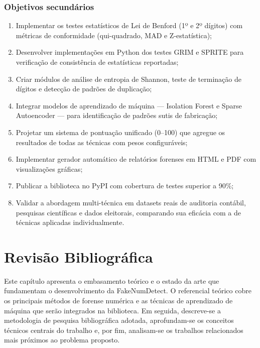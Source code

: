 \documentclass[
    12pt,                %
    openright,           %
    oneside,             %
    a4paper,             %
    english,             %
    brazil               %
]{abntex2}
\begin{document}
\subsection{Objetivos secundários}

\begin{enumerate}
    \item Implementar os testes estatísticos de Lei de Benford (1º e 2º dígitos) com métricas de conformidade (qui-quadrado, MAD e Z-estatística);
    \item Desenvolver implementações em Python dos testes GRIM e SPRITE para verificação de consistência de estatísticas reportadas;
    \item Criar módulos de análise de entropia de Shannon, teste de terminação de dígitos e detecção de padrões de duplicação;
    \item Integrar modelos de aprendizado de máquina — Isolation Forest e Sparse Autoencoder — para identificação de padrões sutis de fabricação;
    \item Projetar um sistema de pontuação unificado (0--100) que agregue os resultados de todas as técnicas com pesos configuráveis;
    \item Implementar gerador automático de relatórios forenses em HTML e PDF com visualizações gráficas;
    \item Publicar a biblioteca no PyPI com cobertura de testes superior a 90\%;
    \item Validar a abordagem multi-técnica em datasets reais de auditoria contábil, pesquisas científicas e dados eleitorais, comparando sua eficácia com a de técnicas aplicadas individualmente.
\end{enumerate}

\chapter{Revisão Bibliográfica}
\label{cap:revisao}

Este capítulo apresenta o embasamento teórico e o estado da arte que fundamentam o desenvolvimento da FakeNumDetect. O referencial teórico cobre os principais métodos de forense numérica e as técnicas de aprendizado de máquina que serão integrados na biblioteca. Em seguida, descreve-se a metodologia de pesquisa bibliográfica adotada, aprofundam-se os conceitos técnicos centrais do trabalho e, por fim, analisam-se os trabalhos relacionados mais próximos ao problema proposto.
\end{document}
